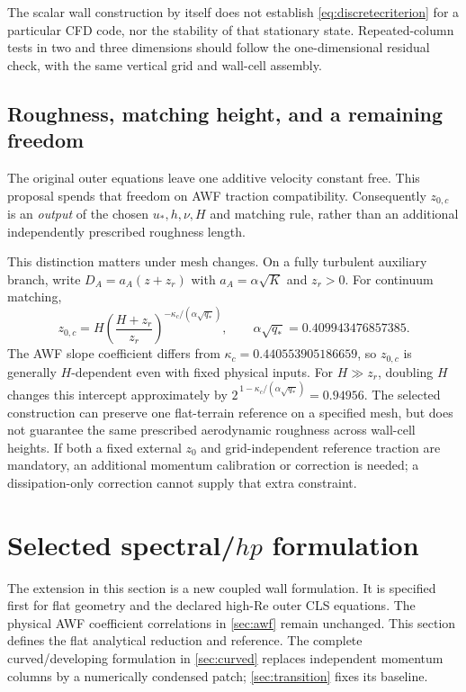 \documentclass[11pt,a4paper]{article}
\numberwithin{equation}{section}
\newcommand{\ust}{u_*}
\newcommand{\kc}{\kappa_c}
\newcommand{\qs}{q_*}
\begin{document}
The scalar wall construction by itself does not establish
\cref{eq:discretecriterion} for a particular CFD code, nor the stability
of that stationary state. Repeated-column tests in two and three
dimensions should follow the one-dimensional residual check, with the
same vertical grid and wall-cell assembly.

\subsection{Roughness, matching height, and a remaining freedom}
\label{sec:meshroughness}
The original outer equations leave one additive velocity constant free.
This proposal spends that freedom on AWF traction compatibility.
Consequently $z_{0,c}$ is an \emph{output} of the chosen $\ust,h,\nu,H$
and matching rule, rather than an additional independently prescribed
roughness length.

This distinction matters under mesh changes. On a fully turbulent
auxiliary branch, write
$D_A=a_A(z+z_r)$ with $a_A=\alpha\sqrt K$ and $z_r>0$.
For continuum matching,
\begin{equation}
 z_{0,c}
 =H\left(\frac{H+z_r}{z_r}\right)^{-\kc/(\alpha\sqrt{\qs})},
 \qquad
 \alpha\sqrt{\qs}=0.409943476857385.
\label{eq:z0mesh}
\end{equation}
The AWF slope coefficient differs from $\kc=0.440553905186659$,
so $z_{0,c}$ is generally $H$-dependent even with fixed physical inputs.
For $H\gg z_r$, doubling $H$ changes this intercept approximately by
$2^{\,1-\kc/(\alpha\sqrt{\qs})}=0.94956$.
The selected construction can preserve one flat-terrain reference on a
specified mesh, but does not guarantee the same prescribed aerodynamic
roughness across wall-cell heights.
If both a fixed external $z_0$ and grid-independent reference traction
are mandatory, an additional momentum calibration or correction is
needed; a dissipation-only correction cannot supply that extra constraint.

\section{Selected spectral/\texorpdfstring{$hp$}{hp} formulation}
\label{sec:hp}
The extension in this section is a new coupled wall formulation. It is
specified first for flat geometry and the declared high-Re outer CLS
equations. The physical AWF coefficient correlations in \cref{sec:awf} remain
unchanged. This section defines the flat analytical reduction and
reference. The complete curved/developing formulation in
\cref{sec:curved} replaces independent momentum columns by a
numerically condensed patch; \cref{sec:transition} fixes its baseline.
\end{document}
